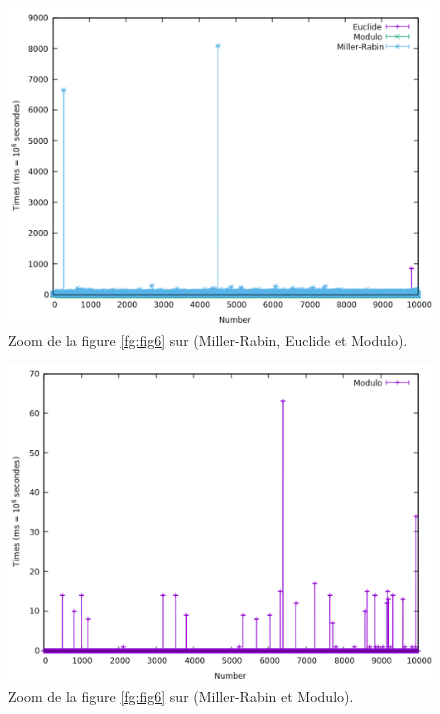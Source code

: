 \begin{figure}[!ht]
		\begin{center}\includegraphics[scale=0.6]{RZoom2.png}\end{center}
		\caption{Zoom de la figure \ref{fg:fig6} sur (Miller-Rabin, Euclide et Modulo).}
		\label{fg:fig7}
\end{figure}
\begin{figure}[!ht]
		\begin{center}\includegraphics[scale=0.5]{RZoom4.png}\end{center}
		\caption{Zoom de la figure \ref{fg:fig6} sur (Miller-Rabin et Modulo).}
		\label{fg:fig8}
\end{figure}

